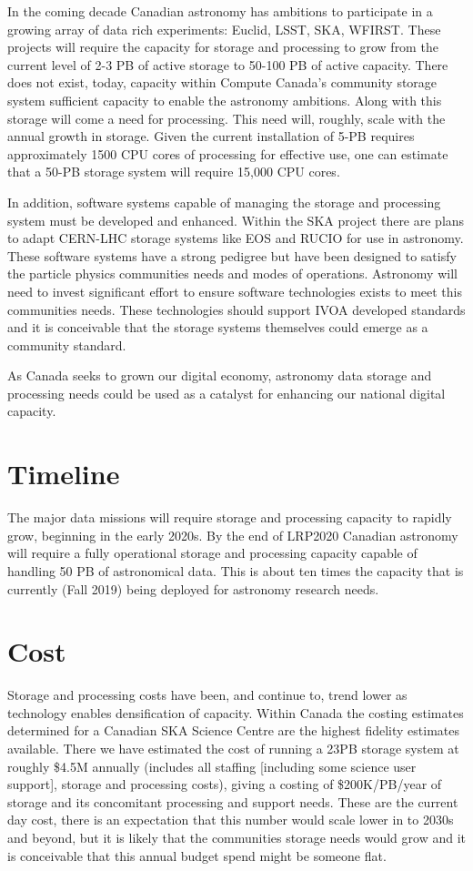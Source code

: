 \documentclass[11pt]{article}
\begin{document}
In the coming decade Canadian astronomy has ambitions to participate in a growing array of data rich experiments:  Euclid, LSST, SKA, WFIRST.  These projects will require the capacity for storage and processing to grow from the current level of 2-3 PB of active storage to 50-100 PB of active capacity.  There does not exist, today, capacity within  Compute Canada's community storage system sufficient capacity to enable the astronomy ambitions.     Along with this storage will come a need for processing.  This need will, roughly, scale with the annual growth in storage.   Given the current installation of 5-PB requires approximately 1500 CPU cores of processing for effective use, one can estimate that a 50-PB storage system will require 15,000 CPU cores.  

In addition, software systems capable of managing the storage and processing system must be developed and enhanced.  Within the SKA project there are plans to adapt CERN-LHC storage systems like EOS and RUCIO for use in astronomy.  These software systems have a strong pedigree but have been designed to satisfy the particle physics communities needs and modes of operations.  Astronomy will need to invest significant effort to ensure software technologies exists to meet this communities needs.  These technologies should support IVOA developed standards and it is conceivable that the storage systems themselves could emerge as a community standard. 

As Canada seeks to grown our digital economy, astronomy data storage and processing needs could be used as a catalyst for enhancing our national digital capacity.

\section{Timeline}
The major data missions will require storage and processing capacity to rapidly grow, beginning in the early 2020s.   By the end of LRP2020 Canadian astronomy will require a fully operational storage and processing capacity capable of handling 50 PB of astronomical data. This is about ten times the capacity that is currently (Fall 2019) being deployed for astronomy research needs.

\section{Cost}
Storage and processing costs have been, and continue to, trend lower as technology enables densification of capacity.   Within Canada the costing estimates determined for a Canadian SKA Science Centre are the highest fidelity estimates available.  There we have estimated the cost of running a 23PB storage system at roughly \$4.5M annually (includes all staffing [including some science user support], storage and processing costs), giving a costing of \$200K/PB/year of storage and its concomitant processing and support needs. These are the current day cost, there is an expectation that this number would scale lower in to 2030s and beyond, but it is likely that the communities storage needs would grow and it is conceivable that this annual budget spend might be someone flat.
\end{document}
